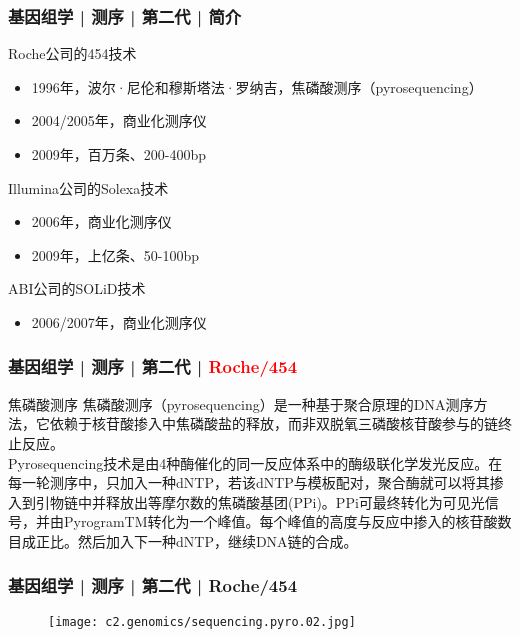 \begin{frame}
  \frametitle{基因组学 | 测序 | 第二代 | 简介}
  \begin{block}{Roche公司的454技术}
  \begin{itemize}
    \item 1996年，波尔·尼伦和穆斯塔法·罗纳吉，焦磷酸测序（pyrosequencing）
    \item 2004/2005年，商业化测序仪
    \item 2009年，百万条、200-400bp
  \end{itemize}
  \end{block}
  \pause
  \begin{block}{Illumina公司的Solexa技术}
  \begin{itemize}
    \item 2006年，商业化测序仪
    \item 2009年，上亿条、50-100bp
  \end{itemize}
  \end{block}
  \pause
  \begin{block}{ABI公司的SOLiD技术}
  \begin{itemize}
    \item 2006/2007年，商业化测序仪
  \end{itemize}
  \end{block}
\end{frame}

\begin{frame}
  \frametitle{基因组学 | 测序 | 第二代 | \textcolor{red}{Roche/454}}
  \begin{block}{焦磷酸测序}
焦磷酸测序（pyrosequencing）是一种基于聚合原理的DNA测序方法，它依赖于核苷酸掺入中焦磷酸盐的释放，而非双脱氧三磷酸核苷酸参与的链终止反应。\\
\vspace{1em}
Pyrosequencing技术是由4种酶催化的同一反应体系中的酶级联化学发光反应。在每一轮测序中，只加入一种dNTP，若该dNTP与模板配对，聚合酶就可以将其掺入到引物链中并释放出等摩尔数的焦磷酸基团(PPi)。PPi可最终转化为可见光信号，并由PyrogramTM转化为一个峰值。每个峰值的高度与反应中掺入的核苷酸数目成正比。然后加入下一种dNTP，继续DNA链的合成。
  \end{block}
\end{frame}

\begin{frame}
  \frametitle{基因组学 | 测序 | 第二代 | Roche/454}
  \begin{figure}
    \centering
    \texttt{[image: c2.genomics/sequencing.pyro.02.jpg]}
  \end{figure}
\end{frame}

